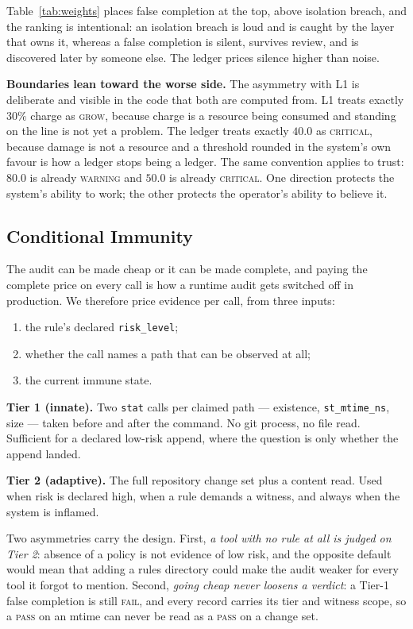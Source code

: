 \documentclass[conference]{IEEEtran}
\begin{document}
Table~\ref{tab:weights} places false completion at the top, above isolation
breach, and the ranking is intentional: an isolation breach is loud and is caught
by the layer that owns it, whereas a false completion is silent, survives review,
and is discovered later by someone else. The ledger prices silence higher than
noise.

\textbf{Boundaries lean toward the worse side.}
The asymmetry with L1 is deliberate and visible in the code that both are
computed from. L1 treats exactly $30\%$ charge as \textsc{grow}, because charge is
a resource being consumed and standing on the line is not yet a problem. The
ledger treats exactly $40.0$ as \textsc{critical}, because damage is not a
resource and a threshold rounded in the system's own favour is how a ledger stops
being a ledger. The same convention applies to trust: $80.0$ is already
\textsc{warning} and $50.0$ is already \textsc{critical}. One direction protects
the system's ability to work; the other protects the operator's ability to
believe it.

\subsection{Conditional Immunity}
\label{sec:immunity}

The audit can be made cheap or it can be made complete, and paying the complete
price on every call is how a runtime audit gets switched off in production.
We therefore price evidence per call, from three inputs:

\begin{enumerate}
  \item the rule's declared \texttt{risk\_level};
  \item whether the call names a path that can be observed at all;
  \item the current immune state.
\end{enumerate}

\textbf{Tier 1 (innate).} Two \texttt{stat} calls per claimed path --- existence,
\texttt{st\_mtime\_ns}, size --- taken before and after the command. No git
process, no file read. Sufficient for a declared low-risk append, where the
question is only whether the append landed.

\textbf{Tier 2 (adaptive).} The full repository change set plus a content read.
Used when risk is declared high, when a rule demands a witness, and always when
the system is inflamed.

Two asymmetries carry the design. First, \emph{a tool with no rule at all is
judged on Tier 2}: absence of a policy is not evidence of low risk, and the
opposite default would mean that adding a rules directory could make the audit
weaker for every tool it forgot to mention. Second, \emph{going cheap never
loosens a verdict}: a Tier-1 false completion is still \textsc{fail}, and every
record carries its tier and witness scope, so a \textsc{pass} on an mtime can
never be read as a \textsc{pass} on a change set.
\end{document}
